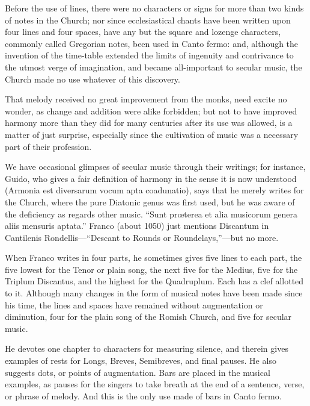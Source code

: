 Before the use of lines, there were no characters or signs for more than two
kinds of notes in the Church; nor since ecclesiastical chants have been written
upon four lines and four spaces, have any but the square and lozenge characters,
commonly called Gregorian notes, been used in Canto fermo: and, although the
invention of the time-table extended the limits of ingenuity and contrivance to
the utmost verge of imagination, and became all-important to secular music,
the Church made no use whatever of this discovery.

That melody received no great improvement from the monks, need excite
no wonder, as change and addition were alike forbidden; but not to have
improved harmony more than they did for many centuries after its use was
allowed, is a matter of just surprise, especially since the cultivation of music
was a necessary part of their profession.

We have occasional glimpses of secular music through their writings; for
instance, Guido, who gives a fair definition of harmony in the sense it is now
understood (Armonia est diversarum vocum apta coadunatio), says that he
merely writes for the Church, where the pure Diatonic genus was first used, but
he was aware of the deficiency as regards other music. “Sunt prœterea et alia
musicorum genera aliis mensuris aptata.” Franco (about 1050) just mentions
Discantum in Cantilenis Rondellis—“Descant to Rounds or Roundelays,”—but
no more.

When Franco writes in four parts, he sometimes gives five lines to each part,
the five lowest for the Tenor or plain song, the next five for the Medius, five for
the Triplum Discantus, and the highest for the Quadruplum. Each has a clef
allotted to it. Although many changes in the form of musical notes have been
made since his time, the lines and spaces have remained without augmentation or
diminution, four for the plain song of the Romish Church, and five for secular
music.

He devotes one chapter to characters for measuring silence, and therein gives
examples of rests for Longs, Breves, Semibreves, and final pauses. He also
suggests dots, or points of augmentation. Bars are placed in the musical examples,
as pauses for the singers to take breath at the end of a sentence, verse, or phrase
of melody. And this is the only use made of bars in Canto fermo.
\pagebreak

